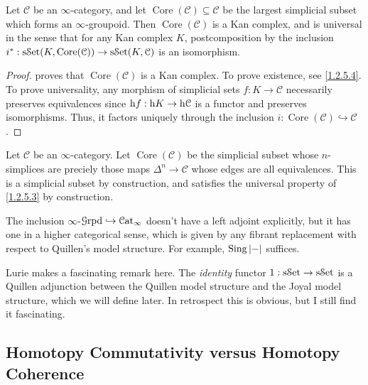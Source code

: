 \begin{proposition}\label{1.2.5.3}
	Let $\mathcal{C} $ be an $\infty $-category, and let $\operatorname{Core}( \mathcal{C}) \subseteq \mathcal{C} $ be the largest simplicial subset which forms an $\infty $-groupoid. Then $\operatorname{Core}( \mathcal{C}) $ is a Kan complex, and is universal in the sense that for any Kan complex $K$, postcomposition by the inclusion $i^* : \mathrm{s}\mathcal{S}\mathrm{et} (K,\operatorname{Core} (\mathcal{C} )) \to \mathrm{s}\mathcal{S}\mathrm{et} (K,\mathcal{C} )$ is an isomorphism.
\end{proposition}
\begin{proof}
	 proves that $\operatorname{Core} (\mathcal{C} )$ is a Kan complex. To prove existence, see \cref{1.2.5.4}. To prove universality, any morphism of simplicial sets $f : K \to \mathcal{C} $ necessarily preserves equivalences since $\mathrm{h} f : \mathrm{h} K \to \mathrm{h} \mathcal{C} $ is a functor and preserves isomorphisms. Thus, it factors uniquely through the inclusion $i : \operatorname{Core} (\mathcal{C} )\hookrightarrow \mathcal{C} $.
\end{proof}

\begin{construction}\label{1.2.5.4}
	Let $\mathcal{C} $ be an $\infty $-category. Let $\operatorname{Core} (\mathcal{C})$ be the simplicial subset whose $n$-simplices are preciely those maps $\Delta ^n\to \mathcal{C} $ whose edges are all equivalences. This is a simplicial subset by construction, and satisfies the universal property of \cref{1.2.5.3} by construction.
\end{construction}

The inclusion $\infty $-$\mathcal{G} \mathrm{rpd} \hookrightarrow \mathcal{C}\mathrm{at}_{\infty} $ doesn't have a left adjoint explicitly, but it has one in a higher categorical sense, which is given by any fibrant replacement with respect to Quillen's model structure. For example, $\operatorname{Sing} \left| - \right| $ suffices.

\begin{remark}\label{1.2.5.5}
	Lurie makes a fascinating remark here. The \emph{identity} functor $1: \mathrm{s}\mathcal{S}\mathrm{et}  \to \mathrm{s}\mathcal{S}\mathrm{et} $ is a Quillen adjunction between the Quillen model structure and the Joyal model structure, which we will define later. In retrospect this is obvious, but I still find it fascinating.
\end{remark}

\subsection{Homotopy Commutativity versus Homotopy Coherence}

